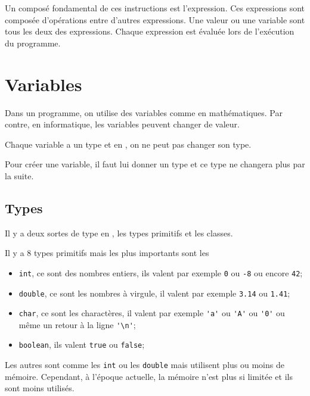 Un composé fondamental de ces instructions est l'expression.
Ces expressions sont composée d'opérations entre d'autres expressions.
Une valeur ou une variable sont tous les deux des expressions.
Chaque expression est évaluée lors de l'exécution du programme.

\section{Variables}
Dans un programme, on utilise des variables comme en mathématiques.
Par contre, en informatique, les variables peuvent changer de valeur.

Chaque variable a un type et en \java{}, on ne peut pas changer son type.

Pour créer une variable, il faut lui donner un type et ce type ne changera
plus par la suite.
\subsection{Types}
Il y a deux sortes de type en \java{}, les types primitifs et les classes.

Il y a 8 types primitifs mais les plus importants sont les
\begin{itemize}
  \item \verb|int|, ce sont des nombres entiers, ils valent par exemple
    \verb|0| ou \verb|-8| ou encore \verb|42|;
  \item \verb|double|, ce sont les nombres à virgule, il valent par exemple
    \verb|3.14| ou \verb|1.41|;
  \item \verb|char|, ce sont les charactères, il valent par exemple \verb|'a'|
    ou \verb|'A'| ou \verb|'0'| ou même un retour à la ligne \verb|'\n'|;
  \item \verb|boolean|, ils valent \verb|true| ou \verb|false|;
\end{itemize}
Les autres sont comme les \verb|int| ou les \verb|double| mais utilisent plus
ou moins de mémoire. Cependant, à l'époque actuelle, la mémoire n'est plus
si limitée et ils sont moins utilisés.

